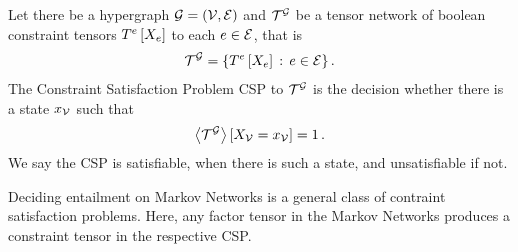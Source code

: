 \begin{definition}
	Let there be a hypergraph $\mathcal{G}=(\mathcal{V},\mathcal{E})$ and $\mathcal{T}^{\mathcal{G}}$ be a tensor network of boolean constraint tensors $T^{e}\left[X_{e}\right]$ to each $e\in\mathcal{E}$, that is
	\begin{align*}
		\mathcal{T}^{\mathcal{G}} = \{ T^{e}\left[X_{e}\right] \, : \, e\in\mathcal{E} \} \, .
	\end{align*}
	The Constraint Satisfaction Problem CSP to $\mathcal{T}^{\mathcal{G}}$ is the decision whether there is a state $x_{\mathcal{V}}$ such that
	\begin{align*}
		\left\langle \mathcal{T}^{\mathcal{G}}\right\rangle \left[ X_{\mathcal{V}}=x_{\mathcal{V}} \right] = 1 \, .
	\end{align*}
	We say the CSP is satisfiable, when there is such a state, and unsatisfiable if not.
\end{definition}


Deciding entailment on Markov Networks is a general class of contraint satisfaction problems.
Here, any factor tensor in the Markov Networks produces a constraint tensor in the respective CSP.

